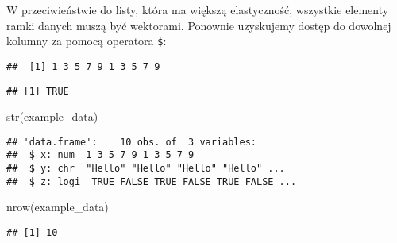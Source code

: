 \documentclass[
]{article}
\newenvironment{Shaded}{\begin{snugshade}}{\end{snugshade}}
\newcommand{\FunctionTok}[1]{\textcolor[rgb]{0.00,0.00,0.00}{#1}}
\newcommand{\NormalTok}[1]{#1}
\newcommand{\SpecialCharTok}[1]{\textcolor[rgb]{0.00,0.00,0.00}{#1}}
\begin{document}
W przeciwieństwie do listy, która ma większą elastyczność, wszystkie
elementy ramki danych muszą być wektorami. Ponownie uzyskujemy dostęp do
dowolnej kolumny za pomocą operatora \texttt{\$}:

\begin{Shaded}
\end{Shaded}

\begin{verbatim}
##  [1] 1 3 5 7 9 1 3 5 7 9
\end{verbatim}

\begin{Shaded}
\end{Shaded}

\begin{verbatim}
## [1] TRUE
\end{verbatim}

\begin{Shaded}
\begin{Highlighting}[]
\FunctionTok{str}\NormalTok{(example\_data)}
\end{Highlighting}
\end{Shaded}

\begin{verbatim}
## 'data.frame':    10 obs. of  3 variables:
##  $ x: num  1 3 5 7 9 1 3 5 7 9
##  $ y: chr  "Hello" "Hello" "Hello" "Hello" ...
##  $ z: logi  TRUE FALSE TRUE FALSE TRUE FALSE ...
\end{verbatim}

\begin{Shaded}
\begin{Highlighting}[]
\FunctionTok{nrow}\NormalTok{(example\_data)}
\end{Highlighting}
\end{Shaded}

\begin{verbatim}
## [1] 10
\end{verbatim}
\end{document}
